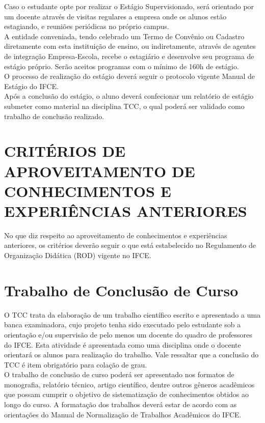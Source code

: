 Caso o estudante opte por realizar o Estágio Supervisionado, será orientado por um docente através de visitas regulares a empresa onde os alunos estão estagiando, e reuniões periódicas no próprio campus.\\

A entidade conveniada, tendo celebrado um Termo de Convênio ou Cadastro diretamente com esta instituição de ensino, ou indiretamente, através de agentes de integração Empresa-Escola, recebe o estagiário e desenvolve seu programa de estágio próprio. Serão aceitos programas com o mínimo de 160h de estágio.\\

O processo de realização do estágio deverá seguir o protocolo vigente Manual de Estágio do IFCE.\\

Após a conclusão do estágio, o aluno deverá confecionar um relatório de estágio submeter como material na disciplina TCC, o qual poderá ser validado como trabalho de conclusão realizado.\\

\chapter{ CRITÉRIOS DE APROVEITAMENTO DE CONHECIMENTOS E EXPERIÊNCIAS
ANTERIORES}

No que diz respeito ao aproveitamento de conhecimentos e experiências anteriores, os critérios deverão seguir o que está estabelecido no Regulamento de Organização Didática (ROD) vigente no IFCE.\\

\chapter{Trabalho de Conclusão de Curso}

O TCC trata da elaboração de um trabalho científico escrito e apresentado a uma banca examinadora, cujo projeto tenha sido executado pelo estudante sob a orientação e/ou supervisão de pelo menos um docente do quadro de professores do IFCE. Esta atividade é apresentada como uma disciplina onde o docente orientará os alunos para realização do trabalho. Vale ressaltar que a conclusão do TCC é item obrigatório para colação de grau.\\

O trabalho de conclusão de curso poderá ser apresentado nos formatos de monografia, relatório técnico, artigo científico, dentre outros gêneros acadêmicos que possam cumprir o objetivo de sistematização de conhecimentos obtidos ao longo do curso. A formatação dos trabalhos deverá estar de acordo com as orientações do Manual de Normalização de Trabalhos Acadêmicos do IFCE.\\


